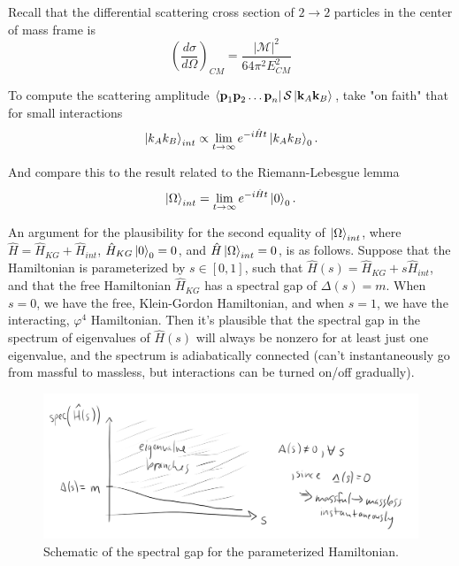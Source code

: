 \noindent Recall that the differential scattering cross section of $2\to 2$ particles in the center of mass frame is
\begin{equation}
\left( \frac{d\sigma}{d\Omega}\right)_{CM} = \frac{|\mathcal{M}|^2}{64 \pi^2 E^2_{CM}}
\end{equation}

\noindent To compute the scattering amplitude $\bra{\textbf{p}_1 \textbf{p}_2 \dots \textbf{p}_n} \mathcal{S} \ket{\textbf{k}_A \textbf{k}_B}$, take "on faith" that for small interactions
\begin{equation}
\ket{k_A k_B}_{int} \propto \lim_{t\to\infty} e^{-i\hat{H}t} \ket{k_A k_B}_0 .
\end{equation}

\noindent And compare this to the result related to the Riemann-Lebesgue lemma
\begin{equation}
\ket{\Omega}_{int} = \lim_{t\to\infty} e^{-i\hat{H}t} \ket{0}_0 . 
\end{equation}

\noindent An argument for the plausibility for the second equality of $\ket{\Omega}_{int}$, where $\hat{H} = \hat{H}_{KG} + \hat{H}_{int}$, $\hat{H}_{KG}\ket{0}_0 = 0$, and $\hat{H}\ket{\Omega}_{int} = 0$, is as follows. Suppose that the Hamiltonian is parameterized by $s \in [0,1]$, such that $\hat{H}(s) = \hat{H}_{KG} + s \hat{H}_{int}$, and that the free Hamiltonian $\hat{H}_{KG}$ has a spectral gap of $\Delta(s)=m$. When $s=0$, we have the free, Klein-Gordon Hamiltonian, and when $s=1$, we have the interacting, $\varphi^4$ Hamiltonian. Then it's plausible that the spectral gap in the spectrum of eigenvalues of $\hat{H}(s)$ will always be nonzero for at least just one eigenvalue, and the spectrum is adiabatically connected (can't instantaneously go from massful to massless, but interactions can be turned on/off gradually). \\

\begin{figure}[H]
	\centering
	\includegraphics[scale=0.4]{eivs.png}
	\caption{Schematic of the spectral gap for the parameterized Hamiltonian.}
\end{figure}

